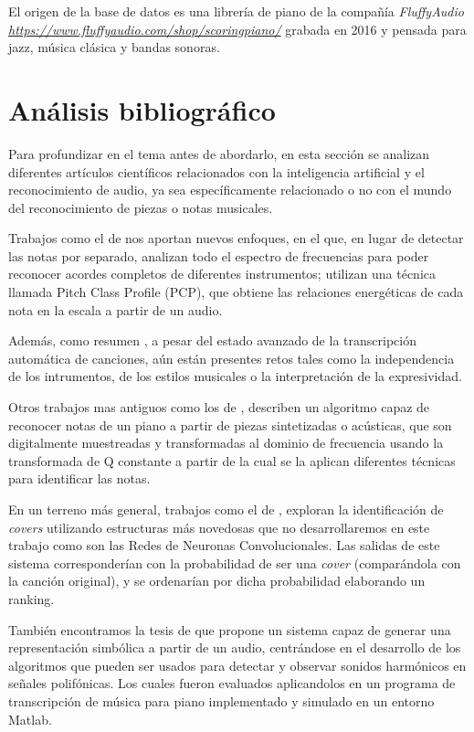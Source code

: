 \documentclass[12pt]{article}
\begin{document}
\bigskip
El origen de la base de datos es una librería de piano de la compañía \textit{FluffyAudio} \textit{\url{https://www.fluffyaudio.com/shop/scoringpiano/}} 
grabada en 2016 y pensada para jazz, música clásica y bandas sonoras.

\section{Análisis bibliográfico}
\label{Análisis bibliográfico}
Para profundizar en el tema antes de abordarlo, en esta sección se analizan diferentes artículos científicos relacionados con la inteligencia
artificial y el reconocimiento de audio, ya sea específicamente relacionado o no con el mundo del reconocimiento de piezas o notas musicales.

\bigskip
Trabajos como el de \cite{osmalsky2012neural} nos aportan nuevos enfoques, 
en el que, en lugar de detectar las notas por separado, analizan todo el espectro de frecuencias para poder reconocer acordes completos de diferentes instrumentos;
utilizan una técnica llamada Pitch Class Profile (PCP), que obtiene las relaciones energéticas de cada nota en la escala a partir de un audio.

\bigskip
Además, como resumen \cite{benetos2018automatic},
a pesar del estado avanzado de la transcripción automática de canciones, aún están presentes retos tales como la independencia de los intrumentos, de los estilos
musicales o la interpretación de la expresividad.

\bigskip
Otros trabajos mas antiguos como los de \cite{foo1999recognition}, describen un algoritmo capaz de reconocer notas
de un piano a partir de piezas sintetizadas o acústicas, que son digitalmente muestreadas y transformadas al dominio de frecuencia usando 
la transformada de Q constante a partir de la cual se la aplican diferentes técnicas para identificar las notas.

\bigskip
En un terreno más general, trabajos como el de \cite{chang2017audio}, exploran la identificación de \textit{covers} utilizando
estructuras más novedosas que no desarrollaremos en este trabajo como son las Redes de Neuronas Convolucionales. Las salidas de este
sistema corresponderían con la probabilidad de ser una \textit{cover} (comparándola con la canción original), y se ordenarían por dicha 
probabilidad elaborando un ranking.

\bigskip
También encontramos la tesis de \cite{klapuri2004signal} que propone un sistema capaz de generar una representación 
simbólica a partir de un audio, centrándose en el desarrollo de los algoritmos que pueden ser usados para detectar y observar sonidos harmónicos en señales polifónicas.
Los cuales fueron evaluados aplicandolos en un programa de transcripción de música para piano implementado y simulado en un entorno Matlab.
\end{document}
